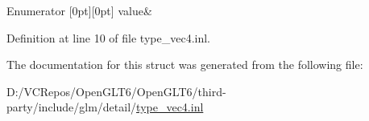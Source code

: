 \begin{DoxyEnumFields}{Enumerator}
[0pt][0pt]{}\mbox{\label{structglm_1_1detail_1_1is__int_a6a1d15bd1184bc07664114fa30199e01a788143fb0374c29be9a2f50e5c493c1b}} 
value&\\
\hline

\end{DoxyEnumFields}


Definition at line 10 of file type\+\_\+vec4.\+inl.



The documentation for this struct was generated from the following file\+:\begin{DoxyCompactItemize}
\item 
D\+:/\+V\+C\+Repos/\+Open\+G\+L\+T6/\+Open\+G\+L\+T6/third-\/party/include/glm/detail/\mbox{\hyperlink{type__vec4_8inl}{type\+\_\+vec4.\+inl}}\end{DoxyCompactItemize}
